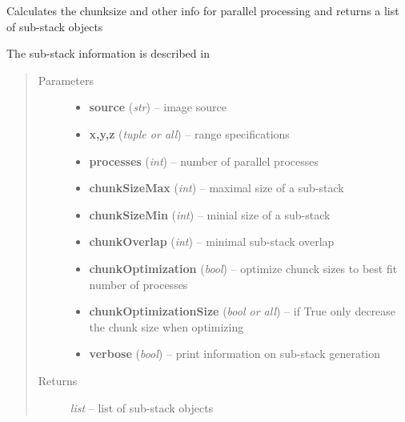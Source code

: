 \documentclass[letterpaper,10pt,english]{sphinxmanual}
\begin{document}

\begin{fulllineitems}
\label{api/ClearMap.ImageProcessing:ClearMap.ImageProcessing.StackProcessing.calculateSubStacks}
Calculates the chunksize and other info for parallel processing and returns a list of sub-stack objects

The sub-stack information is described in 
\begin{quote}\begin{description}
\item[{Parameters}] \leavevmode\begin{itemize}
\item {} 
\textbf{source} (\emph{str}) --
image source

\item {} 
\textbf{x,y,z} (\emph{tuple or all}) --
range specifications

\item {} 
\textbf{processes} (\emph{int}) --
number of parallel processes

\item {} 
\textbf{chunkSizeMax} (\emph{int}) --
maximal size of a sub-stack

\item {} 
\textbf{chunkSizeMin} (\emph{int}) --
minial size of a sub-stack

\item {} 
\textbf{chunkOverlap} (\emph{int}) --
minimal sub-stack overlap

\item {} 
\textbf{chunkOptimization} (\emph{bool}) --
optimize chunck sizes to best fit number of processes

\item {} 
\textbf{chunkOptimizationSize} (\emph{bool or all}) --
if True only decrease the chunk size when optimizing

\item {} 
\textbf{verbose} (\emph{bool}) --
print information on sub-stack generation

\end{itemize}

\item[{Returns}] \leavevmode
\emph{list} --
list of sub-stack objects

\end{description}\end{quote}

\end{fulllineitems}
\end{document}
